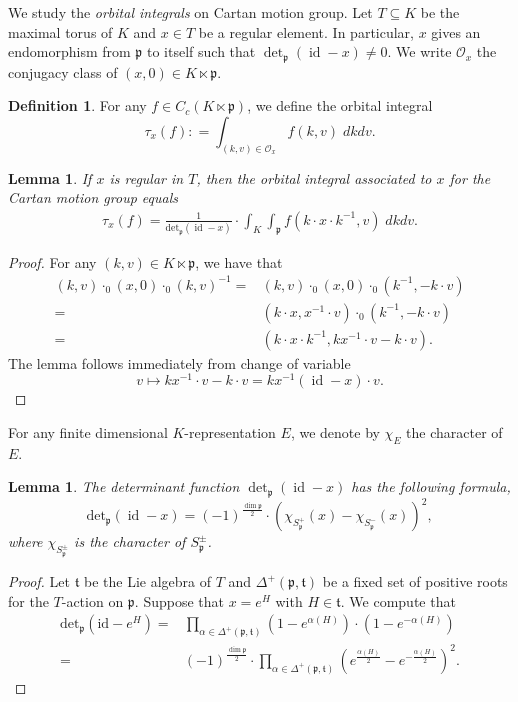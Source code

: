 \documentclass{amsproc}
\newtheorem{lemma}[theorem]{Lemma}
\theoremstyle{definition}
\newtheorem{definition}[theorem]{Definition}
\theoremstyle{remark}
\numberwithin{equation}{section}
\DeclareMathOperator{\id}{id}
\newcommand{\kp}{\mathfrak{p}}
\newcommand{\kt}{\mathfrak{t}}
\begin{document}
We study the \emph{orbital integrals} on Cartan motion group. Let $T\subseteq K$ be the maximal torus of $K$ and $x \in T$ be a regular element. In particular, $x$ gives an endomorphism from $\kp$ to itself such that $\det_\kp(\id - x) \neq 0$. 
We write $\mathcal{O}_x$ the conjugacy class of $(x, 0)\in K \ltimes \kp$.

\begin{definition}
For any $f \in C_c(K \ltimes \kp)$, we define the orbital integral 
\[
\tau_x(f) \colon = \int_{(k, v) \in \mathcal{O}_x} f(k, v)\; dkdv. 
\]	
\end{definition}


\begin{lemma}
\label{integral lem}
If $x$ is regular in $T$, then the orbital integral associated to $x$ for the Cartan motion group equals 
\[
\begin{aligned}
\tau_x(f) = \frac{1}{\mathrm{det}_\kp(\id - x )} \cdot \int_K \int_\kp f(k\cdot x \cdot k^{-1}, v ) \; dk dv.
\end{aligned}
\]
\end{lemma}
\begin{proof}
For any $(k, v) \in K \ltimes \kp$, we have that  
\[
\begin{aligned} 
(k, v) \cdot_0 (x, 0 ) \cdot_0 (k, v)^{-1} = &(k, v) \cdot_0 (x, 0 ) \cdot_0 (k^{-1}, -k\cdot v)\\
=& (k\cdot x, x^{-1}\cdot v ) \cdot_0 (k^{-1}, -k \cdot v)\\
=&(k\cdot x \cdot k^{-1}, kx^{-1}\cdot v  - k \cdot v).
\end{aligned}
\]
The lemma follows immediately from change of variable 
\[
v \mapsto kx^{-1}\cdot v  - k\cdot v=kx^{-1}(\id -x) \cdot v. 
\]
\end{proof}


For any finite dimensional $K$-representation $E$, we denote by $\chi_E$ the character of $E$. 

\begin{lemma}
The determinant function $\det_\kp(\id-x)$ has the following formula, 	
\[
\mathrm{det}_\kp(\id - x ) = (-1)^{\frac{\dim \kp}{2}} \cdot\left(\chi_{S_\kp^+}(x) -\chi_{S_\kp^-}(x) \right)^2,
\]
where $\chi_{S_\kp^\pm}$ is the character of $S_\kp^\pm$. 
\end{lemma}
\begin{proof}
Let $\kt$ be the Lie algebra of $T$ and $\Delta^+(\kp, \kt)$ be a fixed  set of positive roots for the $T$-action on $\kp$. Suppose that $x = e^H$ with  $H\in \kt$. We compute that 
\[
\begin{aligned}
\text{det}_\kp(\text{id} -  e^H)=&\prod_{\alpha\in \Delta^+(\kp, \kt)}\left(1 - e^{\alpha(H)}\right) \cdot \left(1 - e^{-\alpha(H)}\right)\\
=&(-1)^{\frac{\dim \kp}{2}} \cdot \prod_{\alpha\in \Delta^+(\kp, \kt)}\left(e^{\frac{\alpha(H)}{2}} - e^{-\frac{\alpha(H)}{2}}\right)^2.
\end{aligned}
\]	

\end{proof}
\end{document}
